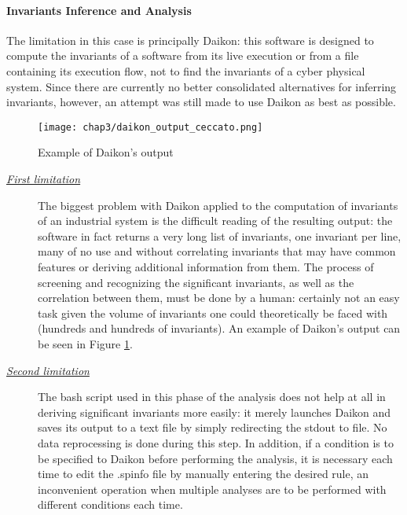 \paragraph{Invariants Inference and Analysis}
\label{par:3_invariant_limitations}
The limitation in this case is principally Daikon: this software is designed to compute the invariants of a software from its live execution or from a file containing its execution flow, not to find the invariants of a cyber physical system. Since there are currently no better consolidated alternatives for inferring invariants, however, an attempt was still made to use Daikon as best as possible.

\begin{figure}[ht]
	\centering
	\texttt{[image: chap3/daikon\_output\_ceccato.png]}
	\caption{Example of Daikon's output}
	\label{fig:daikon_output_ceccato}
\end{figure}

\begin{description}
	\item[\emph{\underline{First limitation}}] The biggest problem with Daikon applied to the computation of invariants of an industrial system is the difficult reading of the resulting output: the software in fact returns a very long list of invariants, one invariant per line, many of no use and without correlating invariants that may have common features or deriving additional information from them. The process of screening and recognizing the significant invariants, as well as the correlation between them, must be done by a human: certainly not an easy task given the volume of invariants one could theoretically be faced with (hundreds and hundreds of invariants). An example of Daikon's output can be seen in Figure \ref{fig:daikon_output_ceccato}.

	\item[\emph{\underline{Second limitation}}] The bash script used in this phase of the analysis does not help at all in deriving significant invariants more easily: it merely launches Daikon and saves its output to a text file by simply redirecting the stdout to file. No data reprocessing is done during this step. In addition, if a condition is to be specified to Daikon before performing the analysis, it is necessary each time to edit the .spinfo file by manually entering the desired rule, an inconvenient operation when multiple analyses are to be performed with different conditions each time. 
\end{description}
\vfill
\nolinenumbers
